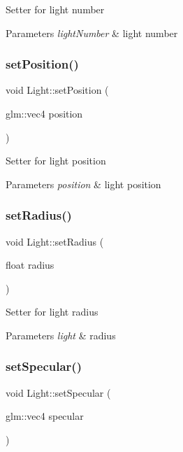 Setter for light number 
\begin{DoxyParams}{Parameters}
{\em light\+Number} & light number \\
\hline
\end{DoxyParams}
\mbox{\label{classLight_a568e3fd99b6863f462071cf872c3cde0}} 
\subsubsection{\texorpdfstring{set\+Position()}{setPosition()}}
{\footnotesize\ttfamily void Light\+::set\+Position (\begin{DoxyParamCaption}\item[{glm\+::vec4}]{position }\end{DoxyParamCaption})}

Setter for light position 
\begin{DoxyParams}{Parameters}
{\em position} & light position \\
\hline
\end{DoxyParams}
\mbox{\label{classLight_a23e09d82da020bc04cd9cecf8ca1461b}} 
\subsubsection{\texorpdfstring{set\+Radius()}{setRadius()}}
{\footnotesize\ttfamily void Light\+::set\+Radius (\begin{DoxyParamCaption}\item[{float}]{radius }\end{DoxyParamCaption})}

Setter for light radius 
\begin{DoxyParams}{Parameters}
{\em light} & radius \\
\hline
\end{DoxyParams}
\mbox{\label{classLight_a578d1435c4dd9a940c68ea34b32197e1}} 
\subsubsection{\texorpdfstring{set\+Specular()}{setSpecular()}}
{\footnotesize\ttfamily void Light\+::set\+Specular (\begin{DoxyParamCaption}\item[{glm\+::vec4}]{specular }\end{DoxyParamCaption})}


